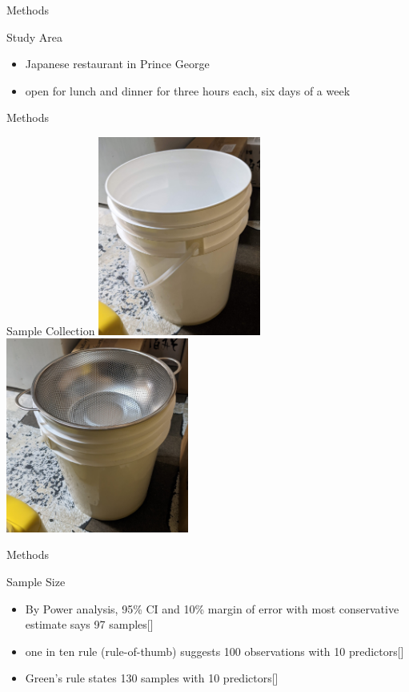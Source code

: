 \documentclass[
  ignorenonframetext,
]{beamer}
\providecommand{\tightlist}{%
  \setlength{\itemsep}{0pt}\setlength{\parskip}{0pt}}
\begin{document}
\begin{frame}{Methods}
\protect\hypertarget{methods-1}{}
\begin{block}{Study Area}
\protect\hypertarget{study-area}{}
\begin{itemize}
\tightlist
\item
  Japanese restaurant in Prince George
\item
  open for lunch and dinner for three hours each, six days of a week
\end{itemize}
\end{block}
\end{frame}

\begin{frame}{Methods}
\protect\hypertarget{methods-2}{}
\begin{block}{Sample Collection}
\protect\hypertarget{sample-collection}{}
\includegraphics[width=0.4\textwidth,height=\textheight]{busket.jpg}
\includegraphics[width=0.45\textwidth,height=\textheight]{busketStrainer.jpg}
\end{block}
\end{frame}

\begin{frame}{Methods}
\protect\hypertarget{methods-3}{}
\begin{block}{Sample Size}
\protect\hypertarget{sample-size}{}
\begin{itemize}
\tightlist
\item
  By Power analysis, 95\% CI and 10\% margin of error with most
  conservative estimate says 97 samples{[}{]}
\item
  one in ten rule (rule-of-thumb) suggests 100 observations with 10
  predictors{[}{]}
\item
  Green's rule states 130 samples with 10 predictors{[}{]}
\end{itemize}
\end{block}
\end{frame}
\end{document}

